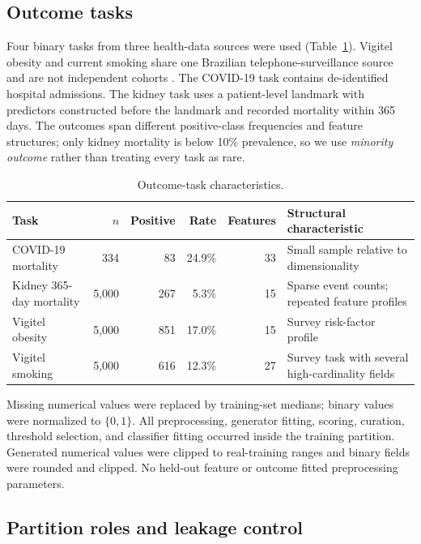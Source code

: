 \subsection{Outcome tasks}

Four binary tasks from three health-data sources were used (Table~\ref{tab:datasets}). Vigitel obesity and current smoking share one Brazilian telephone-surveillance source and are not independent cohorts \citep{bernal2017}. The COVID-19 task contains de-identified hospital admissions. The kidney task uses a patient-level landmark with predictors constructed before the landmark and recorded mortality within 365 days. The outcomes span different positive-class frequencies and feature structures; only kidney mortality is below 10\% prevalence, so we use \emph{minority outcome} rather than treating every task as rare.

\begin{table}[htbp]
\centering
\caption{Outcome-task characteristics.}
\label{tab:datasets}
\small
\begin{tabularx}{\textwidth}{lrrrrX}
\toprule
Task & $n$ & Positive & Rate & Features & Structural characteristic\\
\midrule
COVID-19 mortality & 334 & 83 & 24.9\% & 33 & Small sample relative to dimensionality\\
Kidney 365-day mortality & 5,000 & 267 & 5.3\% & 15 & Sparse event counts; repeated feature profiles\\
Vigitel obesity & 5,000 & 851 & 17.0\% & 15 & Survey risk-factor profile\\
Vigitel smoking & 5,000 & 616 & 12.3\% & 27 & Survey task with several high-cardinality fields\\
\bottomrule
\end{tabularx}
\end{table}

Missing numerical values were replaced by training-set medians; binary values were normalized to $\{0,1\}$. All preprocessing, generator fitting, scoring, curation, threshold selection, and classifier fitting occurred inside the training partition. Generated numerical values were clipped to real-training ranges and binary fields were rounded and clipped. No held-out feature or outcome fitted preprocessing parameters.

\subsection{Partition roles and leakage control}

